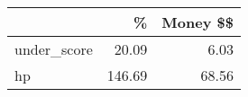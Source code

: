 \begin{table}
\centering
\begin{tabular}[t]{lrr}
\toprule
  & \% & Money \$\$\\
\midrule
under\_score & 20.09 & 6.03\\
hp & 146.69 & 68.56\\
\bottomrule
\end{tabular}
\end{table}
